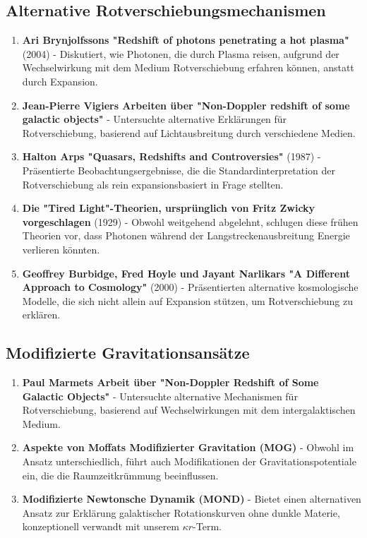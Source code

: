 \documentclass[12pt,a4paper]{article}
\begin{document}
	\subsection{Alternative Rotverschiebungsmechanismen}
	\label{subsec:alternative_redshift}
	
	\begin{enumerate}
		\item \textbf{Ari Brynjolfssons "Redshift of photons penetrating a hot plasma"}\cite{brynjolfsson2004} (2004) - Diskutiert, wie Photonen, die durch Plasma reisen, aufgrund der Wechselwirkung mit dem Medium Rotverschiebung erfahren können, anstatt durch Expansion.
		
		\item \textbf{Jean-Pierre Vigiers Arbeiten über "Non-Doppler redshift of some galactic objects"}\cite{vigier1990} - Untersuchte alternative Erklärungen für Rotverschiebung, basierend auf Lichtausbreitung durch verschiedene Medien.
		
		\item \textbf{Halton Arps "Quasars, Redshifts and Controversies"}\cite{arp1987} (1987) - Präsentierte Beobachtungsergebnisse, die die Standardinterpretation der Rotverschiebung als rein expansionsbasiert in Frage stellten.
		
		\item \textbf{Die "Tired Light"-Theorien, ursprünglich von Fritz Zwicky vorgeschlagen}\cite{zwicky1929} (1929) - Obwohl weitgehend abgelehnt, schlugen diese frühen Theorien vor, dass Photonen während der Langstreckenausbreitung Energie verlieren könnten.
		
		\item \textbf{Geoffrey Burbidge, Fred Hoyle und Jayant Narlikars "A Different Approach to Cosmology"}\cite{burbidge2000} (2000) - Präsentierten alternative kosmologische Modelle, die sich nicht allein auf Expansion stützen, um Rotverschiebung zu erklären.
	\end{enumerate}
	
	\subsection{Modifizierte Gravitationsansätze}
	\label{subsec:modified_gravity_lit}
	
	\begin{enumerate}
		\item \textbf{Paul Marmets Arbeit über "Non-Doppler Redshift of Some Galactic Objects"}\cite{marmet1988} - Untersuchte alternative Mechanismen für Rotverschiebung, basierend auf Wechselwirkungen mit dem intergalaktischen Medium.
		
		\item \textbf{Aspekte von Moffats Modifizierter Gravitation (MOG)}\cite{moffat2006} - Obwohl im Ansatz unterschiedlich, führt auch Modifikationen der Gravitationspotentiale ein, die die Raumzeitkrümmung beeinflussen.
		
		\item \textbf{Modifizierte Newtonsche Dynamik (MOND)}\cite{milgrom1983} - Bietet einen alternativen Ansatz zur Erklärung galaktischer Rotationskurven ohne dunkle Materie, konzeptionell verwandt mit unserem $\kappa r$-Term.
	\end{enumerate}
	
\end{document}

